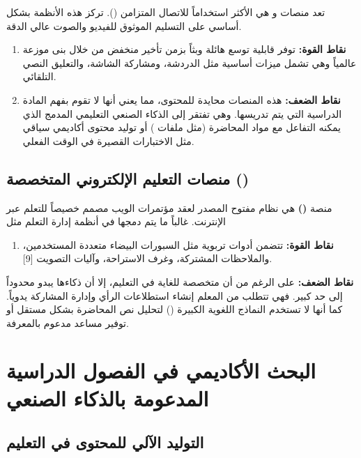 تعد منصات  و هي الأكثر استخداماً للاتصال المتزامن (). تركز هذه الأنظمة بشكل أساسي على التسليم الموثوق للفيديو والصوت عالي الدقة.

\begin{enumerate}
  \item \textbf{نقاط القوة:} توفر قابلية توسع هائلة وبثاً بزمن تأخير منخفض من خلال بنى موزعة عالمياً وهي تشمل ميزات أساسية مثل الدردشة، ومشاركة الشاشة، والتعليق النصي التلقائي.
  \item \textbf{نقاط الضعف:} هذه المنصات محايدة للمحتوى، مما يعني أنها لا تقوم بفهم المادة الدراسية التي يتم تدريسها. وهي تفتقر إلى الذكاء الصنعي التعليمي المدمج الذي يمكنه التفاعل مع مواد المحاضرة (مثل ملفات ) أو توليد محتوى أكاديمي سياقي مثل الاختبارات القصيرة في الوقت الفعلي.
\end{enumerate}

\subsection{منصات التعليم الإلكتروني المتخصصة ()}

منصة \textbf{ ()} هي نظام مفتوح المصدر لعقد مؤتمرات الويب مصمم خصيصاً للتعلم عبر الإنترنت. غالباً ما يتم دمجها في أنظمة إدارة التعلم مثل 

\begin{enumerate}
  \item \textbf{نقاط القوة:} تتضمن  أدوات تربوية مثل السبورات البيضاء متعددة المستخدمين، والملاحظات المشتركة، وغرف الاستراحة، وآليات التصويت [9].
\end{enumerate}

\textbf{نقاط الضعف:} على الرغم من أن  متخصصة للغاية في التعليم، إلا أن ذكاءها يبدو محدوداً إلى حد كبير. فهي تتطلب من المعلم إنشاء استطلاعات الرأي وإدارة المشاركة يدوياً. كما أنها لا تستخدم النماذج اللغوية الكبيرة () لتحليل نص المحاضرة بشكل مستقل أو توفير مساعد مدعوم بالمعرفة.

\section{البحث الأكاديمي في الفصول الدراسية المدعومة بالذكاء الصنعي}

\subsection{التوليد الآلي للمحتوى في التعليم}

